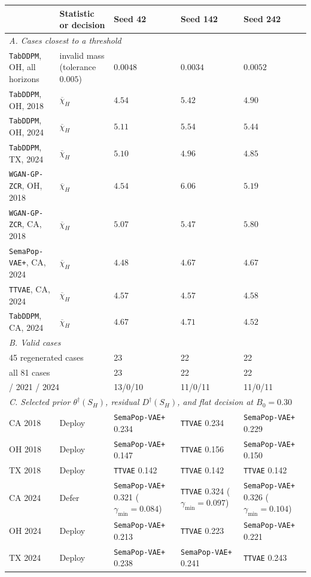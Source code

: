 \begin{tabular}{lllll}
\toprule
 & Statistic or decision & Seed 42 & Seed 142 & Seed 242 \\
\midrule
\multicolumn{5}{l}{\emph{A. Cases closest to a threshold}}\\
\texttt{TabDDPM}, OH, all horizons & invalid mass (tolerance \(0.005\)) & \(0.0048\) & \(0.0034\) & \(\mathbf{0.0052}\) \\
\texttt{TabDDPM}, OH, 2018 & \(\overline{\chi}_H\) & \(4.54\) & \(\mathbf{5.42}\) & \(4.90\) \\
\texttt{TabDDPM}, OH, 2024 & \(\overline{\chi}_H\) & \(\mathbf{5.11}\) & \(\mathbf{5.54}\) & \(\mathbf{5.44}\) \\
\texttt{TabDDPM}, TX, 2024 & \(\overline{\chi}_H\) & \(\mathbf{5.10}\) & \(4.96\) & \(4.85\) \\
\texttt{WGAN-GP-ZCR}, OH, 2018 & \(\overline{\chi}_H\) & \(4.54\) & \(\mathbf{6.06}\) & \(\mathbf{5.19}\) \\
\texttt{WGAN-GP-ZCR}, CA, 2018 & \(\overline{\chi}_H\) & \(\mathbf{5.07}\) & \(\mathbf{5.47}\) & \(\mathbf{5.80}\) \\
\texttt{SemaPop-VAE+}, CA, 2024 & \(\overline{\chi}_H\) & \(4.48\) & \(4.67\) & \(4.67\) \\
\texttt{TTVAE}, CA, 2024 & \(\overline{\chi}_H\) & \(4.57\) & \(4.57\) & \(4.58\) \\
\texttt{TabDDPM}, CA, 2024 & \(\overline{\chi}_H\) & \(4.67\) & \(4.71\) & \(4.52\) \\
\midrule
\multicolumn{5}{l}{\emph{B. Valid cases}}\\
\multicolumn{2}{l}{45 regenerated cases} & 23 & 22 & 22 \\
\multicolumn{2}{l}{all 81 cases} & 23 & 22 & 22 \\
\multicolumn{2}{l}{\quad 2018 / 2021 / 2024} & 13/0/10 & 11/0/11 & 11/0/11 \\
\midrule
\multicolumn{5}{l}{\emph{C. Selected prior \(\theta^\dagger(S_H)\), residual \(D^\dagger(S_H)\), and flat decision at \(B_0=0.30\)}}\\
CA 2018 & Deploy & \texttt{SemaPop-VAE+} 0.234 & \texttt{TTVAE} 0.234 & \texttt{SemaPop-VAE+} 0.229 \\
OH 2018 & Deploy & \texttt{SemaPop-VAE+} 0.147 & \texttt{TTVAE} 0.156 & \texttt{SemaPop-VAE+} 0.150 \\
TX 2018 & Deploy & \texttt{TTVAE} 0.142 & \texttt{TTVAE} 0.142 & \texttt{TTVAE} 0.142 \\
CA 2024 & Defer & \texttt{SemaPop-VAE+} 0.321 (\(\gamma_{\min}=0.084\)) & \texttt{TTVAE} 0.324 (\(\gamma_{\min}=0.097\)) & \texttt{SemaPop-VAE+} 0.326 (\(\gamma_{\min}=0.104\)) \\
OH 2024 & Deploy & \texttt{SemaPop-VAE+} 0.213 & \texttt{TTVAE} 0.223 & \texttt{SemaPop-VAE+} 0.221 \\
TX 2024 & Deploy & \texttt{SemaPop-VAE+} 0.238 & \texttt{SemaPop-VAE+} 0.241 & \texttt{TTVAE} 0.243 \\
\bottomrule
\end{tabular}

